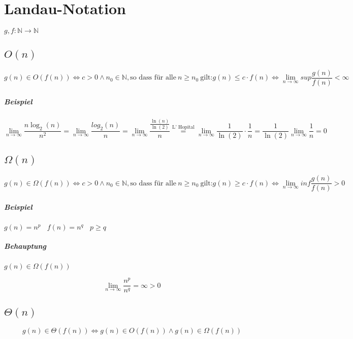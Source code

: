 

\chapter{Landau-Notation}

$g, f : \mathbb{N} \rightarrow \mathbb{N}$

\section{$O(n)$}
\[g(n) \in O(f(n)) \Leftrightarrow c > 0 \land n_0 \in \mathbb{N}, \text{so dass für alle}~n \geq n_0~\text{gilt:} g(n) \leq c \cdot f(n) \Leftrightarrow \lim\limits_{n \rightarrow \infty}{sup \frac{g(n)}{f(n)}} < \infty\]
\paragraph{Beispiel}
\[\lim\limits_{n \rightarrow \infty}{\frac{n \log_2(n)}{n^2}} = \lim\limits_{n \rightarrow \infty}{\frac{log_2(n)}{n}} = \lim\limits_{n \rightarrow \infty} {\frac{\frac{\ln(n)}{\ln(2)}}{n}} \stackrel{\text{L' Hopital}}{=} \lim\limits_{n \rightarrow \infty}{\frac{1}{\ln(2)} \cdot \frac{1}{n}} = \frac{1}{\ln(2)} \lim\limits_{n \rightarrow \infty}{\frac{1}{n} = 0}
\]


\section{$\Omega(n)$}
\[g(n) \in \Omega(f(n)) \Leftrightarrow c > 0 \land n_0 \in \mathbb{N}, \text{so dass für alle}~n \geq n_0~\text{gilt:} g(n) \geq c \cdot f(n) \Leftrightarrow \lim\limits_{n \rightarrow \infty}{inf \frac{g(n)}{f(n)}} > 0\]
\paragraph{Beispiel} $g(n) = n^p~~~~f(n)=n^q~~~~p \geq q$
\paragraph{Behauptung} $g(n) \in \Omega(f(n))$

\[\lim\limits_{n \rightarrow \infty}{\frac{n^p}{n^q}} = \infty > 0\]


\section{$\Theta(n)$}
\[g(n) \in \Theta(f(n)) \Leftrightarrow g(n) \in O(f(n)) \land g(n) \in \Omega(f(n))\]
